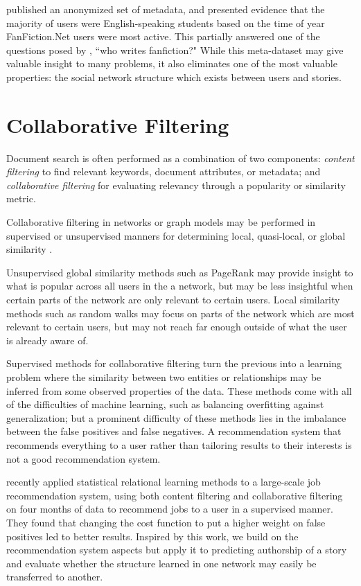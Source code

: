 \documentclass[letterpaper]{article}
\begin{document}
\cite{yin2017no} published an anonymized set of metadata, and presented evidence that the majority of users were English-speaking students based on the time of year FanFiction.Net users were most active.  This partially answered one of the questions posed by \cite{barnes2015fanfiction}, ``who writes fanfiction?"  While this meta-dataset may give valuable insight to many problems, it also eliminates one of the most valuable properties: the social network structure which exists between users and stories.

\section{Collaborative Filtering}

Document search is often performed as a combination of two components: \textit{content filtering} to find relevant keywords, document attributes, or metadata; and \textit{collaborative filtering} for evaluating relevancy through a popularity or similarity metric.

Collaborative filtering in networks or graph models may be performed in supervised or unsupervised manners for determining local, quasi-local, or global similarity \cite{nickel2016review,breese1998empirical}.

Unsupervised global similarity methods such as PageRank may provide insight to what is popular across all users in the a network, but may be less insightful when certain parts of the network are only relevant to certain users. Local similarity methods such as random walks may focus on parts of the network which are most relevant to certain users, but may not reach far enough outside of what the user is already aware of.

Supervised methods for collaborative filtering turn the previous into a learning problem where the similarity between two entities or relationships may be inferred from some observed properties of the data. These methods come with all of the difficulties of machine learning, such as balancing overfitting against generalization; but a prominent difficulty of these methods lies in the imbalance between the false positives and false negatives. A recommendation system that recommends everything to a user rather than tailoring results to their interests is not a good recommendation system.

\cite{yang2017combining} recently applied statistical relational learning methods to a large-scale job recommendation system, using both content filtering and collaborative filtering on four months of data to recommend jobs to a user in a supervised manner.  They found that changing the cost function to put a higher weight on false positives led to better results. Inspired by this work, we build on the recommendation system aspects but apply it to predicting authorship of a story and evaluate whether the structure learned in one network may easily be transferred to another.
\end{document}
